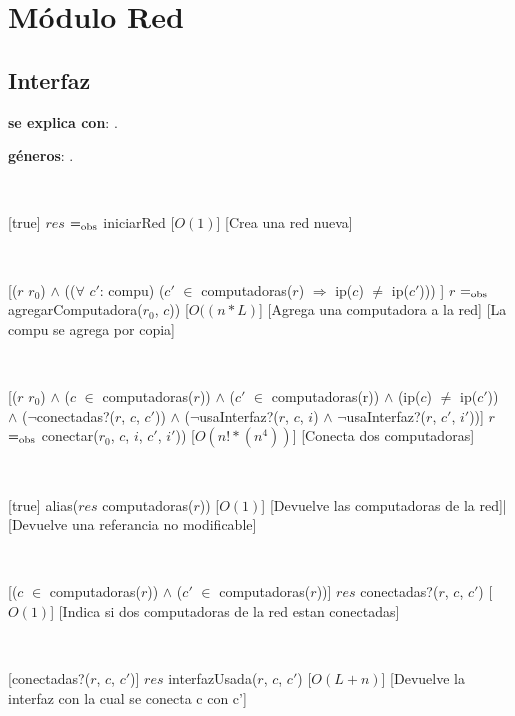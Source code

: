\section{Módulo Red}

\subsection{Interfaz}

\textbf{se explica con}: .

\textbf{géneros}: .

  ~

  [true]
  {$res$ $=_{\mathrm{obs}}$ iniciarRed}
  [$O(1)$]
  [Crea una red nueva]


  ~

  [($r$ \igobs $r_0$) $\land$ (($\forall$ $c'$: compu) ($c'$ $\in$ computadoras($r$) $\Rightarrow$  ip($c$) $\neq$  ip($c'$)))  ]
  {$r$ $=_{\mathrm{obs}}$ agregarComputadora($r_0$, $c$)) }
  [$O((n*L)$]
  [Agrega una computadora a la red]
  [La compu se agrega por copia]

  ~

  [($r$ \igobs $r_0$) $\land$ ($c$ $\in$ computadoras($r$)) $\land$ ($c'$ $\in$ computadoras(r)) $\land$ (ip($c$) $\neq$ ip($c'$)) \\
   $\land$ ($\neg$conectadas?($r$, $c$, $c'$)) $\land$ ($\neg$usaInterfaz?($r$, $c$, $i$) $\land$ $\neg$usaInterfaz?($r$, $c'$, $i'$))]
  {$r$ $=_{\mathrm{obs}}$ conectar($r_0$, $c$, $i$, $c'$, $i'$))}
  [$O(n!*(n^4))$]
  [Conecta dos computadoras]

  ~


  [true]
  {alias($res$ \igobs computadoras($r$))}
  [$O(1)$]
  [Devuelve las computadoras de la red]|
  [Devuelve una referancia no modificable]

  ~

  [($c$ $\in$ computadoras($r$)) $\land$ ($c'$ $\in$ computadoras($r$))]
  {$res$ \igobs conectadas?($r$, $c$, $c'$)}
  [$O(1)$]
  [Indica si dos computadoras de la red estan conectadas]

  ~

  [conectadas?($r$, $c$, $c'$)]
  {$res$ \igobs interfazUsada($r$, $c$, $c'$)}
  [$O(L + n)$]
  [Devuelve la interfaz con la cual se conecta c con c']

